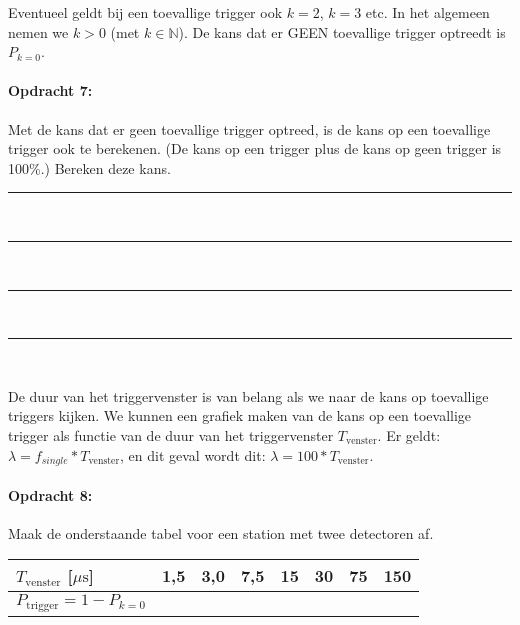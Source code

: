 \bigskip{}

Eventueel geldt bij een toevallige trigger ook $k=2$, $k=3$ etc.
In het algemeen nemen we $k>0$ (met $k\mathbb{\in N}$). De kans
dat er GEEN toevallige trigger optreedt is $P_{k=0}$.

\begin{minipage}[t]{1\columnwidth}%

\paragraph{Opdracht 7:}

Met de kans dat er geen toevallige trigger optreed, is de
kans op een toevallige trigger ook te berekenen. (De kans op een trigger
plus de kans op geen trigger is 100\%.) Bereken deze kans.

\begin{center}
    \rule{\textwidth}{0.3mm}\\
    \rule{\textwidth}{0.3mm}\\
    \rule{\textwidth}{0.3mm}\\
    \rule{\textwidth}{0.3mm}\\
\end{center}
\end{minipage}

\bigskip{}

De duur van het triggervenster is van belang als we naar de kans op
toevallige triggers kijken. We kunnen een grafiek maken van de kans
op een toevallige trigger als functie van de duur van het triggervenster
$T_\textrm{venster}$. Er geldt: $\lambda=f_{single}*T_\textrm{venster}$, en dit
geval wordt dit: $\lambda=100*T_\textrm{venster}$$ $. 

\begin{minipage}[t]{1\columnwidth}%

\paragraph{Opdracht 8:}

Maak de onderstaande tabel voor een station met twee detectoren
af.

\bigskip{}


\begin{tabular}{|x{.20\textwidth}|x{.07\textwidth}|x{.07\textwidth}
                |x{.07\textwidth}|x{.07\textwidth}|x{.07\textwidth}
                |x{.07\textwidth}|x{.07\textwidth}|}
    \hline 
    $T_\textrm{venster}$ {[}$\mu\mathrm{s}${]} & 1,5 & 3,0 & 7,5 & 15 & 30 & 75 & 150\tabularnewline
    \hline 
    $P_\textrm{trigger}=1-P_{k=0}$ &  &  &  &  &  &  & \tabularnewline
    \hline 
\end{tabular}
\end{minipage}

